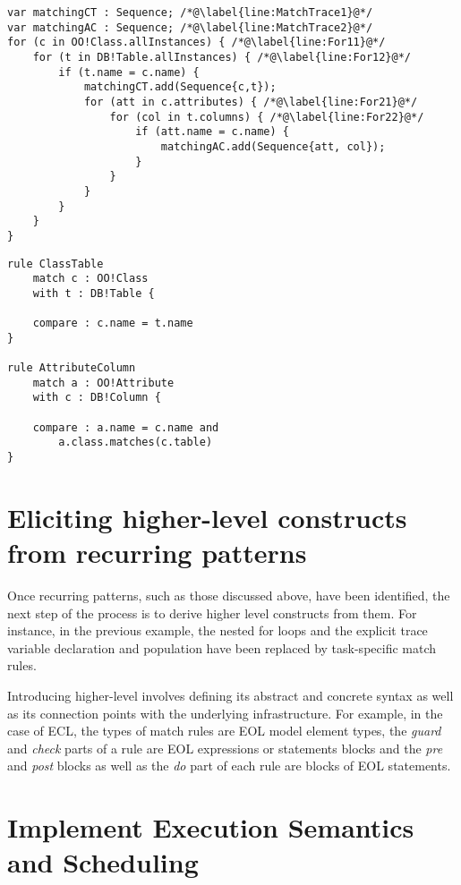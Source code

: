 \begin{lstlisting}[caption=Comparing an OO model with a DB model using EOL, label=lst:ComparisonEOL, language=EOL]
var matchingCT : Sequence; /*@\label{line:MatchTrace1}@*/
var matchingAC : Sequence; /*@\label{line:MatchTrace2}@*/
for (c in OO!Class.allInstances) { /*@\label{line:For11}@*/
	for (t in DB!Table.allInstances) { /*@\label{line:For12}@*/
		if (t.name = c.name) {
			matchingCT.add(Sequence{c,t});
			for (att in c.attributes) { /*@\label{line:For21}@*/
				for (col in t.columns) { /*@\label{line:For22}@*/
					if (att.name = c.name) {
						matchingAC.add(Sequence{att, col});
					}
				}
			}
		}
	}
}
\end{lstlisting}

\begin{lstlisting}[caption=Comparing an OO model with a DB model using ECL, label=lst:ComparisonECL, language=ECL]
rule ClassTable
	match c : OO!Class
	with t : DB!Table {
	
	compare : c.name = t.name
}

rule AttributeColumn
	match a : OO!Attribute 
	with c : DB!Column {
	
	compare : a.name = c.name and
		a.class.matches(c.table)
}
\end{lstlisting}

\section{Eliciting higher-level constructs from recurring patterns}

Once recurring patterns, such as those discussed above, have been identified, the next step of the process is to derive higher level constructs from them. For instance, in the previous example, the nested for loops and the explicit trace variable declaration and population have been replaced by task-specific match rules.

Introducing higher-level involves defining its abstract and concrete syntax as well as its connection points with the underlying infrastructure. For example, in the case of ECL, the types of match rules are EOL model element types, the \emph{guard} and \emph{check} parts of a rule are EOL expressions or statements blocks and the \emph{pre} and \emph{post} blocks as well as the \emph{do} part of each rule are blocks of EOL statements.

\section{Implement Execution Semantics and Scheduling}

